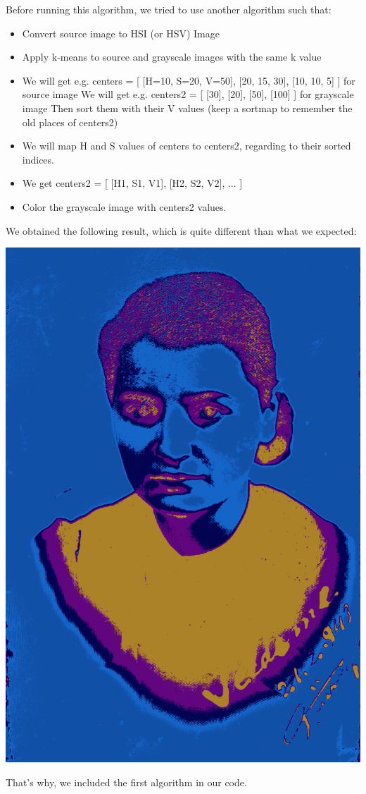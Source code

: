 \documentclass[conference]{IEEEtran}
\begin{document}
Before running this algorithm, we tried to use another algorithm such that:
\begin{itemize}
        \item  Convert source image to HSI (or HSV) Image
        \item  Apply k-means to source and grayscale images with the same k value
        \item  We will get e.g. centers = [ [H=10, S=20, V=50], [20, 15, 30], [10, 10, 5] ] for source image
            We will get e.g. centers2 = [ [30], [20], [50], [100] ] for grayscale image
            Then sort them with their V values (keep a sortmap to remember the old places of centers2)
        \item  We will map H and S values of centers to centers2, regarding to their sorted indices.
        \item  We get centers2 = [ [H1, S1, V1], [H2, S2, V2], ... ]
        \item  Color the grayscale image with centers2 values. 
\end{itemize}
We obtained the following result, which is quite different than what we expected:

\includegraphics[width=0.5\linewidth]{test.png}

That's why, we included the first algorithm in our code.
\end{document}
